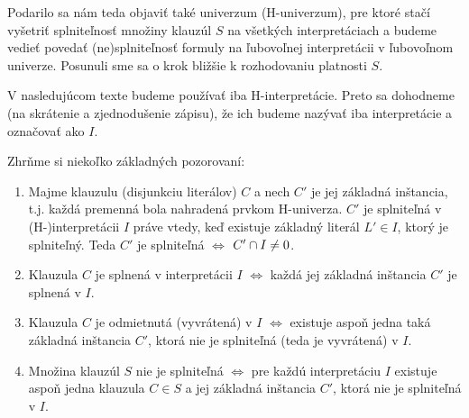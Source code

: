 Podarilo sa nám teda objaviť také univerzum (H-univerzum), pre ktoré
stačí vyšetriť splniteľnosť množiny klauzúl $S$ na všetkých
interpretáciach a budeme vedieť povedať (ne)splniteľnosť formuly na
ľubovoľnej interpretácii v ľubovoľnom univerze. Posunuli sme sa o krok
bližšie k rozhodovaniu platnosti $S$.

\begin{poznamka}
    V nasledujúcom texte budeme používať iba H-interpretácie.
    Preto sa dohodneme (na skrátenie a zjednodušenie zápisu), že
    ich budeme nazývať iba interpretácie a označovať ako $I$.
\end{poznamka}

\begin{poznamka}
    Zhrňme si niekoľko základných pozorovaní:
    \begin{enumerate}
	\item Majme klauzulu (disjunkciu literálov) $C$
            a nech $C'$ je jej základná inštancia, t.j. 
            každá premenná bola nahradená prvkom H-univerza.
            $C'$ je splniteľná v (H-)interpretácii $I$
	    práve vtedy, keď existuje základný literál $L' \in I$,
            ktorý je splniteľný.
            Teda $C'$ je splniteľná $\iff$ $C' \cap I \ne 0$.            

	\item Klauzula $C$ je splnená v interpretácii $I$ $\iff$ každá jej
	    základná inštancia $C'$ je splnená v $I$.

	\item Klauzula $C$ je odmietnutá (vyvrátená) v $I$ $\iff$ existuje
	    aspoň jedna taká základná inštancia $C'$, ktorá 
            nie je splniteľná (teda je vyvrátená) v $I$.

	\item Množina klauzúl $S$ nie je splniteľná $\iff$ 
            pre každú interpretáciu $I$ existuje aspoň jedna klauzula
            $C\in S$ a jej základná inštancia $C'$, 
            ktorá nie je splniteľná v $I$.
    \end{enumerate}
\end{poznamka}

